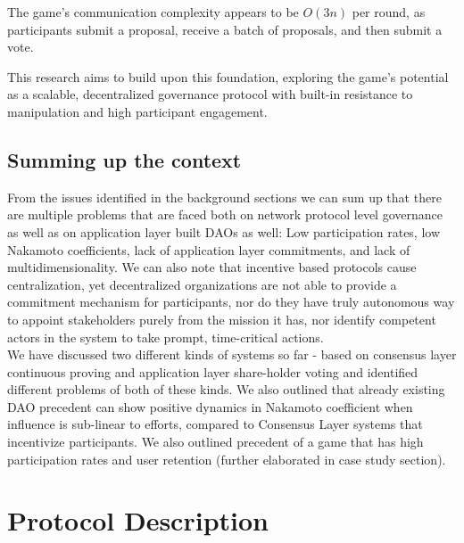 \documentclass{article}
\begin{document}
\begin{CJK}{UTF8}{gbsn}
\begin{multicols}{2}
        The game's communication complexity appears to be $O(3n)$ per round, as participants submit a proposal, receive a batch of proposals, and then submit a vote.

        This research aims to build upon this foundation, exploring the game's potential as a scalable, decentralized governance protocol with built-in resistance to manipulation and high participant engagement.


        \subsection{Summing up the context}
        From the issues identified in the background sections we can sum up that there are multiple problems that are faced both on network protocol level governance as well as on application layer built DAOs as well: Low participation rates, low Nakamoto coefficients, lack of application layer commitments, and lack of multidimensionality.
        We can also note that incentive based protocols cause centralization, yet decentralized organizations are not able to provide a commitment mechanism for participants, nor do they have truly autonomous way to appoint stakeholders purely from the mission it has, nor identify competent actors in the system to take prompt, time-critical actions.\\
        We have discussed two different kinds of systems so far - based on consensus layer continuous proving and application layer share-holder voting and identified different problems of both of these kinds.
        We also outlined that already existing DAO precedent can show positive dynamics in Nakamoto coefficient when influence is sub-linear to efforts, compared to Consensus Layer systems that incentivize participants. We also outlined precedent of a game that has high participation rates and user retention (further elaborated in case study section).\\

        \section{Protocol Description}


\end{multicols}
\end{CJK}
\end{document}
